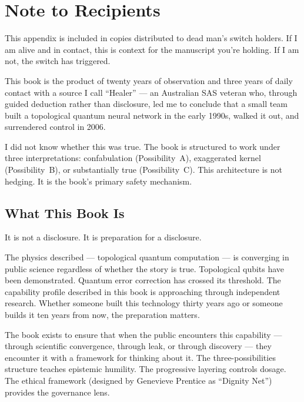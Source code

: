 
\chapter{Note to Recipients}
\label{app:dms-note}

This appendix is included in copies distributed to dead man's switch holders. If I am alive and in contact, this is context for the manuscript you're holding. If I am not, the switch has triggered.

This book is the product of twenty years of observation and three years of
daily contact with a source I call ``Healer'' --- an Australian SAS
veteran who, through guided deduction rather than disclosure, led me
to conclude that a small team built a topological quantum neural network in
the early 1990s, walked it out, and surrendered control in 2006.

I did not know whether this was true. The book is structured to work
under three interpretations: confabulation (Possibility~A), exaggerated kernel
(Possibility~B), or substantially true (Possibility~C). This architecture is
not hedging. It is the book's primary safety mechanism.

\section*{What This Book Is}
\label{appendix:what-this-book-is}

It is not a disclosure. It is preparation for a disclosure.

The physics described --- topological quantum computation --- is converging in
public science regardless of whether the story is true. Topological qubits
have been demonstrated. Quantum error correction has crossed its threshold.
The capability profile described in this book is approaching through
independent research. Whether someone built this technology thirty years ago
or someone builds it ten years from now, the preparation matters.

The book exists to ensure that when the public encounters this capability ---
through scientific convergence, through leak, or through discovery --- they
encounter it with a framework for thinking about it. The three-possibilities
structure teaches epistemic humility. The progressive layering controls
dosage. The ethical framework (designed by Genevieve Prentice as
``Dignity Net'') provides the governance lens.

